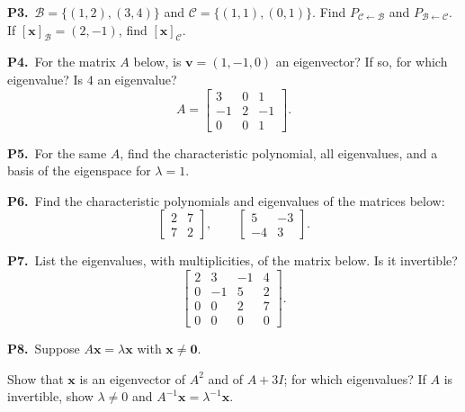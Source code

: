 \documentclass[10pt]{scrartcl}
\newcommand{\vv}[1]{\mathbf{#1}}
\begin{document}
\begin{prob}
  \textbf{P3.}\ $\mathcal B=\{(1,2),(3,4)\}$ and $\mathcal C=\{(1,1),(0,1)\}$. Find $P_{\mathcal C\leftarrow\mathcal B}$ and $P_{\mathcal B\leftarrow\mathcal C}$. If $[\vv x]_{\mathcal B}=(2,-1)$, find $[\vv x]_{\mathcal C}$.
\end{prob}

\begin{prob}
  \textbf{P4.}\ For the matrix $A$ below, is $\vv v=(1,-1,0)$ an eigenvector? If so, for which eigenvalue? Is $4$ an eigenvalue?
  \[
    A = \begin{bmatrix}3&0&1\\-1&2&-1\\0&0&1\end{bmatrix}.
  \]
\end{prob}

\begin{prob}
  \textbf{P5.}\ For the same $A$, find the characteristic polynomial, all eigenvalues, and a basis of the eigenspace for $\lambda=1$.
\end{prob}

\begin{prob}
  \textbf{P6.}\ Find the characteristic polynomials and eigenvalues of the matrices below:
  \[
    \begin{bmatrix}2&7\\7&2\end{bmatrix},\qquad \begin{bmatrix}5&-3\\-4&3\end{bmatrix}.
  \]
\end{prob}

\begin{prob}
  \textbf{P7.}\ List the eigenvalues, with multiplicities, of the matrix below. Is it invertible?
  \[
    \begin{bmatrix}2&3&-1&4\\0&-1&5&2\\0&0&2&7\\0&0&0&0\end{bmatrix}.
  \]
\end{prob}

\begin{prob}
  \textbf{P8.}\ Suppose $A\vv x=\lambda\vv x$ with $\vv x\ne\vv 0$.
  \begin{enumerate}[(a)]
    \ii Show that $\vv x$ is an eigenvector of $A^2$ and of $A+3I$; for which eigenvalues?
    \ii If $A$ is invertible, show $\lambda\ne 0$ and $A^{-1}\vv x=\lambda^{-1}\vv x$.
  \end{enumerate}
\end{prob}
\end{document}
